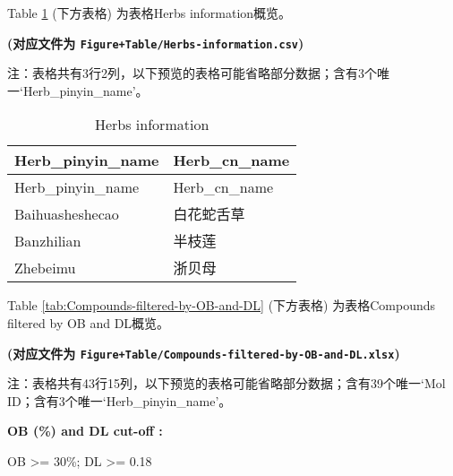 \documentclass[
]{article}
\begin{document}
\begin{center}\vspace{1.5cm}\end{center}

Table \ref{tab:Herbs-information} (下方表格) 为表格Herbs information概览。

\textbf{(对应文件为 \texttt{Figure+Table/Herbs-information.csv})}

\begin{center}\begin{tcolorbox}[colback=gray!10, colframe=gray!50, width=0.9\linewidth, arc=1mm, boxrule=0.5pt]注：表格共有3行2列，以下预览的表格可能省略部分数据；含有3个唯一`Herb\_pinyin\_name'。
\end{tcolorbox}
\end{center}

\begin{longtable}[]{@{}ll@{}}
\caption{\label{tab:Herbs-information}Herbs information}\tabularnewline
\toprule
Herb\_pinyin\_name & Herb\_cn\_name\tabularnewline
\midrule
\endfirsthead
\toprule
Herb\_pinyin\_name & Herb\_cn\_name\tabularnewline
\midrule
\endhead
Baihuasheshecao & 白花蛇舌草\tabularnewline
Banzhilian & 半枝莲\tabularnewline
Zhebeimu & 浙贝母\tabularnewline
\bottomrule
\end{longtable}

\begin{center}\vspace{1.5cm}\end{center}

\begin{center}\vspace{1.5cm}\end{center}

Table \ref{tab:Compounds-filtered-by-OB-and-DL} (下方表格) 为表格Compounds filtered by OB and DL概览。

\textbf{(对应文件为 \texttt{Figure+Table/Compounds-filtered-by-OB-and-DL.xlsx})}

\begin{center}\begin{tcolorbox}[colback=gray!10, colframe=gray!50, width=0.9\linewidth, arc=1mm, boxrule=0.5pt]注：表格共有43行15列，以下预览的表格可能省略部分数据；含有39个唯一`Mol ID；含有3个唯一`Herb\_pinyin\_name'。
\end{tcolorbox}
\end{center}\begin{center}\begin{tcolorbox}[colback=gray!10, colframe=gray!50, width=0.9\linewidth, arc=1mm, boxrule=0.5pt]
\textbf{
OB (\%) and DL cut-off
:}

\vspace{0.5em}

    OB >= 30\%; DL >= 0.18

\vspace{2em}
\end{tcolorbox}
\end{center}
\end{document}
